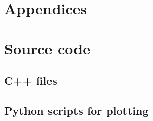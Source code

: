 \documentclass[a4paper,english, 10pt, twoside]{article}
\begin{document}
\section{Appendices}
\appendix
\section{Source code}
\subsection*{C++ files}


\subsection*{Python scripts for plotting}


\end{document}
